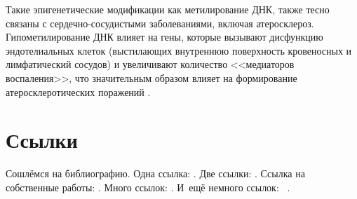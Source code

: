 Такие эпигенетические модификации как метилирование ДНК, также тесно связаны с сердечно-сосудистыми заболеваниями, включая атеросклероз. Гипометилирование ДНК влияет на гены, которые вызывают дисфункцию эндотелиальных клеток (выстилающих внутреннюю поверхность кровеносных и лимфатический сосудов) и увеличивают количество <<медиаторов воспаления>>, что значительным образом влияет на формирование атеросклеротических поражений \autocite{Castro2003}. 



\section{Ссылки}\label{sec:ch1/sec2}

Сошлёмся на библиографию.
Одна ссылка: \cite[с.~54]{Sokolov}\cite[с.~36]{Gaidaenko}.
Две ссылки: \cite{Sokolov,Gaidaenko}.
Ссылка на собственные работы: \cite{vakbib1, confbib2}.
Много ссылок: %
\cite{Lermontov, Management, Borozda, Marketing, Constitution, FamilyCode,
Gost.7.0.53, Razumovski, Lagkueva, Pokrovski, Methodology, Berestova,
Kriger}%
%
.
И~ещё немного ссылок:~\cite{Article,Book,Booklet,Conference,Inbook,Incollection,Manual,Mastersthesis,
Misc,Phdthesis,Proceedings,Techreport,Unpublished}
\cite{medvedev2006jelektronnye, CEAT:CEAT581, doi:10.1080/01932691.2010.513279,
Gosele1999161,Li2007StressAnalysis, Shoji199895, test:eisner-sample,
test:eisner-sample-shorted, AB_patent_Pomerantz_1968, iofis_patent1960}
%
.

%


